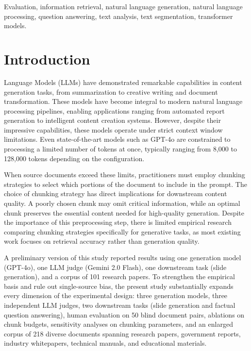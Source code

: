 \documentclass{ieeeaccess}
\begin{document}
\begin{keywords}
Evaluation, information retrieval, natural language generation, natural language processing, question answering, text analysis, text segmentation, transformer models.
\end{keywords}

\titlepgskip=-21pt

\maketitle

\section{Introduction}
\label{sec:introduction}
 Language Models (LLMs) have demonstrated remarkable capabilities in content generation tasks, from summarization to creative writing and document transformation. These models have become integral to modern natural language processing pipelines, enabling applications ranging from automated report generation to intelligent content creation systems. However, despite their impressive capabilities, these models operate under strict context window limitations. Even state-of-the-art models such as GPT-4o are constrained to processing a limited number of tokens at once, typically ranging from 8,000 to 128,000 tokens depending on the configuration.

When source documents exceed these limits, practitioners must employ chunking strategies to select which portions of the document to include in the prompt. The choice of chunking strategy has direct implications for downstream content quality. A poorly chosen chunk may omit critical information, while an optimal chunk preserves the essential content needed for high-quality generation. Despite the importance of this preprocessing step, there is limited empirical research comparing chunking strategies specifically for generative tasks, as most existing work focuses on retrieval accuracy rather than generation quality.

A preliminary version of this study reported results using one generation model (GPT-4o), one LLM judge (Gemini 2.0 Flash), one downstream task (slide generation), and a corpus of 101 research papers. To strengthen the empirical basis and rule out single-source bias, the present study substantially expands every dimension of the experimental design: three generation models, three independent LLM judges, two downstream tasks (slide generation and factual question answering), human evaluation on 50 blind document pairs, ablations on chunk budgets, sensitivity analyses on chunking parameters, and an enlarged corpus of 218 diverse documents spanning research papers, government reports, industry whitepapers, technical manuals, and educational materials.
\end{document}
